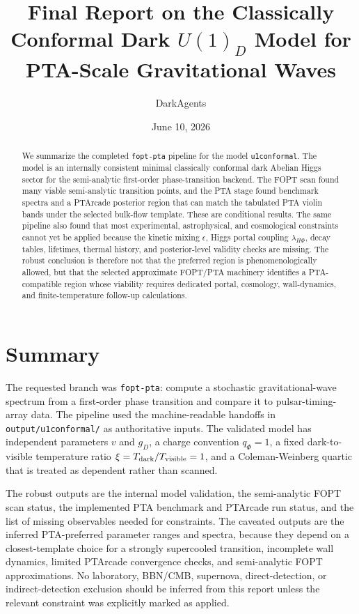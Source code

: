 \documentclass[11pt]{article}
\title{Final Report on the Classically Conformal Dark \(U(1)_D\) Model for PTA-Scale Gravitational Waves}
\author{DarkAgents}
\date{June 10, 2026}
\newcommand{\model}{\texttt{u1conformal}}
\newcommand{\gD}{g_D}
\newcommand{\lamHP}{\lambda_{H\Phi}}
\newcommand{\eps}{\epsilon}
\begin{document}
\maketitle

\begin{abstract}
We summarize the completed \texttt{fopt-pta} pipeline for the model \model. The model is an internally consistent minimal classically conformal dark Abelian Higgs sector for the semi-analytic first-order phase-transition backend. The FOPT scan found many viable semi-analytic transition points, and the PTA stage found benchmark spectra and a PTArcade posterior region that can match the tabulated PTA violin bands under the selected bulk-flow template. These are conditional results. The same pipeline also found that most experimental, astrophysical, and cosmological constraints cannot yet be applied because the kinetic mixing \(\eps\), Higgs portal coupling \(\lamHP\), decay tables, lifetimes, thermal history, and posterior-level validity checks are missing. The robust conclusion is therefore not that the preferred region is phenomenologically allowed, but that the selected approximate FOPT/PTA machinery identifies a PTA-compatible region whose viability requires dedicated portal, cosmology, wall-dynamics, and finite-temperature follow-up calculations.
\end{abstract}

\section{Summary}

The requested branch was \texttt{fopt-pta}: compute a stochastic gravitational-wave spectrum from a first-order phase transition and compare it to pulsar-timing-array data. The pipeline used the machine-readable handoffs in \texttt{output/u1conformal/} as authoritative inputs. The validated model has independent parameters \(v\) and \(\gD\), a charge convention \(q_\Phi=1\), a fixed dark-to-visible temperature ratio \(\xi=T_{\rm dark}/T_{\rm visible}=1\), and a Coleman-Weinberg quartic that is treated as dependent rather than scanned.

The robust outputs are the internal model validation, the semi-analytic FOPT scan status, the implemented PTA benchmark and PTArcade run status, and the list of missing observables needed for constraints. The caveated outputs are the inferred PTA-preferred parameter ranges and spectra, because they depend on a closest-template choice for a strongly supercooled transition, incomplete wall dynamics, limited PTArcade convergence checks, and semi-analytic FOPT approximations. No laboratory, BBN/CMB, supernova, direct-detection, or indirect-detection exclusion should be inferred from this report unless the relevant constraint was explicitly marked as applied.
\end{document}
